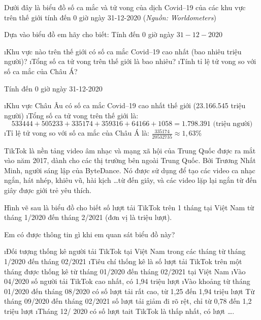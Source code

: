 \begin{bt}
	Dưới đây là biểu đồ số ca mắc và tử vong của dịch Covid--19 của các khu vực trên thế giới tính đến 0 giờ ngày 31-12-2020 (\textit{Nguồn: Worldometers}) 
	
	Dựa vào biểu đồ em hãy cho biết: Tính đến 0 giờ ngày $31-12-2020$
	\begin{enumerate}[a),leftmargin=*]
		\i Khu vực nào trên thế giới có số ca mắc Covid--19 cao nhất (bao nhiêu triệu người)? 
		\i Tổng số ca tử vong trên thế giới là bao nhiêu?
		\i Tính tỉ lệ tử vong so với số ca mắc của Châu Á?
	\end{enumerate}
	\begin{loigiaichuong42}
		Tính đến 0 giờ ngày 31-12-2020
		\begin{enumerate}[a),leftmargin=*]
			\i Khu vực Châu Âu có số ca mắc Covid--19 cao nhất thế giới (23.166.545 triệu người)
			\i Tổng số ca tử vong trên thế giới là: 
			\[533444 + 505233 + 335174 + 359316 + 64166 + 1058 = 1.798.391 \text{ (triệu người)}\]  
			\i Tỉ lệ tử vong so với số ca mắc của Châu Á là:  $\frac{{335174}}{{20532735}} \approx 1,63\%$
		\end{enumerate}
	\end{loigiaichuong42}
\end{bt}
\begin{bt}
	TikTok là nền tảng video âm nhạc và mạng xã hội của Trung Quốc được ra mắt vào năm 2017, dành cho các thị trường bên ngoài Trung Quốc. Bởi Trương Nhất Minh, người sáng lập của ByteDance. Nó được sử dụng để tạo các video ca nhạc ngắn, hát nhép, khiêu vũ, hài kịch \ldots từ   đến   giây, và các video lặp lại ngắn từ   đến   giây được giới trẻ yêu thích. 
	
	Hình vẽ sau là biểu đồ cho biết số lượt tải TikTok trên 1 tháng tại Việt Nam từ tháng 1/2020 đến tháng 2/2021 (đơn vị là triệu lượt).
	
	Em có được thông tin gì khi em quan sát biểu đồ này?
	\begin{loigiaichuong42}
		\begin{enumerate}[--,leftmargin=*]
			\i Đối tượng thống kê người tải TikTok tại Việt Nam trong các tháng từ tháng 1/2020 đến tháng 02/2021
			\i Tiêu chí thống kê là số lượt tải TikTok trên một tháng được thống kê từ tháng 01/2020 đến tháng 02/2021 tại Việt Nam 
			\i Vào 04/2020 số người tải TikTok cao nhất, có 1,94 triệu lượt
			\i Vào khoảng từ tháng 01/2020 đến tháng 08/2020 có số lượt tải rất cao, từ 1,25  đến 1,94 triệu lượt
			Từ tháng 09/2020 đến tháng 02/2021 số lượt tải giảm đi rõ rệt, chỉ từ 0,78 đến 1,2 triệu lượt 
			\i Tháng 12/ 2020 có số lượt tait TikTok là thấp nhất, có  lượt \ldots.
		\end{enumerate}
	\end{loigiaichuong42}
\end{bt}

